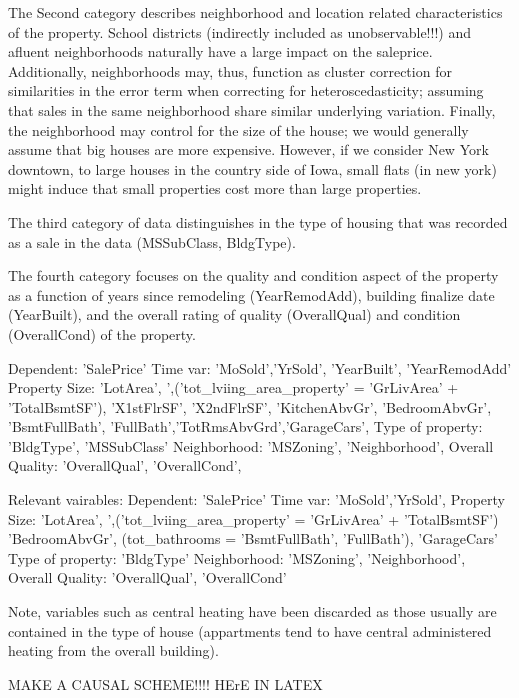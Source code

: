 \documentclass{article}
\begin{document}
The Second category describes neighborhood and location related characteristics of the property. School districts (indirectly included as unobservable!!!) and afluent neighborhoods naturally have a large impact on the saleprice. Additionally, neighborhoods may, thus, function as cluster correction for similarities in the error term when correcting for heteroscedasticity; assuming that sales in the same neighborhood share similar underlying variation. Finally, the neighborhood may control for the size of the house; we would generally assume that big houses are more expensive. However, if we consider New York downtown, to large houses in the country side of Iowa, small flats (in new york) might induce that small properties cost more than large properties. 

The third category of data distinguishes in the type of housing that was recorded as a sale in the data (MSSubClass, BldgType). 

The fourth category focuses on the quality and condition aspect of the property as a function of years since remodeling (YearRemodAdd), building finalize date (YearBuilt), and the overall rating of quality (OverallQual) and condition (OverallCond) of the property.


Dependent: 'SalePrice'
Time var:  'MoSold','YrSold', 'YearBuilt', 'YearRemodAdd'
Property Size: 'LotArea', ',('tot_lviing_area_property' = 'GrLivArea' + 'TotalBsmtSF'), 'X1stFlrSF', 'X2ndFlrSF', 'KitchenAbvGr', 'BedroomAbvGr', 'BsmtFullBath', 'FullBath','TotRmsAbvGrd','GarageCars',
Type of property: 'BldgType', 'MSSubClass'
Neighborhood: 'MSZoning', 'Neighborhood',
Overall Quality: 'OverallQual', 'OverallCond',


Relevant vairables:
Dependent: 'SalePrice'
Time var:  'MoSold','YrSold', 
Property Size: 'LotArea', ',('tot_lviing_area_property' = 'GrLivArea' + 'TotalBsmtSF') 'BedroomAbvGr', (tot_bathrooms = 'BsmtFullBath', 'FullBath'), 'GarageCars'
Type of property: 'BldgType'
Neighborhood: 'MSZoning', 'Neighborhood',
Overall Quality: 'OverallQual', 'OverallCond'




Note, variables such as central heating have been discarded as those usually are contained in the type of house (appartments tend to have central administered heating from the overall building).

MAKE A CAUSAL SCHEME!!!! HErE IN LATEX
\end{document}
